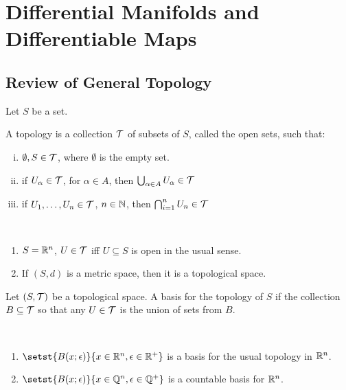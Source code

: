
\section{Differential Manifolds and Differentiable Maps}
\label{Section1}

\subsection{Review of General Topology}

Let $S$ be a set.

\begin{definition}
	A topology is a collection $\mathcal{T}$ of subsets of $S$, called the open sets, such that:
	\begin{enumerate}[(i)]
		\item $\emptyset, S \in \mathcal{T}$, where $\emptyset$ is the empty set.
		\item if $U_\alpha \in \mathcal{T}$, for $\alpha\in A$, then $\bigcup_{\alpha\in A} U_\alpha \in \mathcal{T}$
		\item if $U_1, \dots, U_n \in \mathcal{T}$, $n \in \mathbb N$, then $\bigcap_{i=1}^n U_n \in \mathcal{T}$  
	\end{enumerate}
\end{definition}

\begin{example}
	~
	\begin{enumerate}[(1)]
		\item $ S=\mathbb R^n$, $U \in \mathcal{T}$ iff $U \subseteq S$ is open in the usual sense.
		\item If $(S, d)$ is a metric space, then it is a topological space.
	\end{enumerate}
\end{example}

\begin{definition}
	Let $(S,\mathcal{T})$ be a topological space. A basis for the topology of $S$ if the collection $B \subseteq \mathcal{T}$ so that any $U\in\mathcal{T}$ is the union of sets from $B$.
\end{definition}

\begin{example}
	~
	\begin{enumerate}[(1)]
		\item $\setst{B(x;\epsilon)}{ x \in \bbR^n, \epsilon\in\bbR^+}$ is a basis for the usual topology in $\mathbb R^n$.
		\item $\setst{B(x;\epsilon)}{ x \in \bbQ^n, \epsilon\in\bbQ^+}$ is a countable basis for $\mathbb R^n$.
	\end{enumerate}
\end{example}

